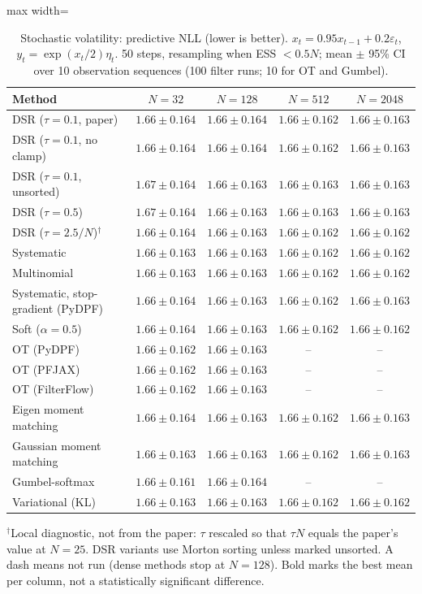 \begin{table}[H]
\centering
\small
\caption{Stochastic volatility: predictive NLL (lower is better). $x_t=0.95x_{t-1}+0.2\varepsilon_t$, $y_t=\exp(x_t/2)\eta_t$. 50 steps, resampling when ESS $<0.5N$; mean $\pm$ 95\% CI over 10 observation sequences (100 filter runs; 10 for OT and Gumbel).}
\label{tab:volatility-predictive_nll}
\begin{adjustbox}{max width=\linewidth}
\begin{tabular}{lcccc}
\toprule
Method & $N{=}32$ & $N{=}128$ & $N{=}512$ & $N{=}2048$ \\
\midrule
DSR ($\tau{=}0.1$, paper) & $1.66\pm0.164$ & $1.66\pm0.164$ & $1.66\pm0.162$ & $1.66\pm0.163$ \\
DSR ($\tau{=}0.1$, no clamp) & $1.66\pm0.164$ & $1.66\pm0.164$ & $1.66\pm0.162$ & $1.66\pm0.163$ \\
DSR ($\tau{=}0.1$, unsorted) & $1.67\pm0.164$ & $1.66\pm0.163$ & $1.66\pm0.163$ & $1.66\pm0.163$ \\
DSR ($\tau{=}0.5$) & $1.67\pm0.164$ & $1.66\pm0.163$ & $1.66\pm0.163$ & $1.66\pm0.163$ \\
DSR ($\tau{=}2.5/N$)$^\dagger$ & $1.66\pm0.164$ & $1.66\pm0.163$ & $1.66\pm0.162$ & $1.66\pm0.162$ \\
\midrule
Systematic & $1.66\pm0.163$ & $1.66\pm0.163$ & $1.66\pm0.162$ & $1.66\pm0.162$ \\
Multinomial & $1.66\pm0.163$ & $1.66\pm0.163$ & $1.66\pm0.162$ & $1.66\pm0.162$ \\
Systematic, stop-gradient (PyDPF) & $1.66\pm0.164$ & $1.66\pm0.163$ & $1.66\pm0.162$ & $1.66\pm0.163$ \\
Soft ($\alpha{=}0.5$) & $1.66\pm0.164$ & $1.66\pm0.163$ & $1.66\pm0.162$ & $1.66\pm0.162$ \\
OT (PyDPF) & $1.66\pm0.162$ & $1.66\pm0.163$ & -- & -- \\
OT (PFJAX) & $\mathbf{1.66\pm0.162}$ & $1.66\pm0.163$ & -- & -- \\
OT (FilterFlow) & $1.66\pm0.162$ & $1.66\pm0.163$ & -- & -- \\
Eigen moment matching & $1.66\pm0.164$ & $1.66\pm0.163$ & $1.66\pm0.162$ & $1.66\pm0.163$ \\
Gaussian moment matching & $1.66\pm0.163$ & $\mathbf{1.66\pm0.163}$ & $1.66\pm0.162$ & $1.66\pm0.163$ \\
Gumbel-softmax & $1.66\pm0.161$ & $1.66\pm0.164$ & -- & -- \\
Variational (KL) & $1.66\pm0.163$ & $1.66\pm0.163$ & $\mathbf{1.66\pm0.162}$ & $\mathbf{1.66\pm0.162}$ \\
\bottomrule
\end{tabular}
\end{adjustbox}
\par\smallskip\parbox{0.95\linewidth}{\footnotesize $^\dagger$Local diagnostic, not from the paper: $\tau$ rescaled so that $\tau N$ equals the paper's value at $N{=}25$. DSR variants use Morton sorting unless marked unsorted. A dash means not run (dense methods stop at $N{=}128$). Bold marks the best mean per column, not a statistically significant difference.}
\end{table}

